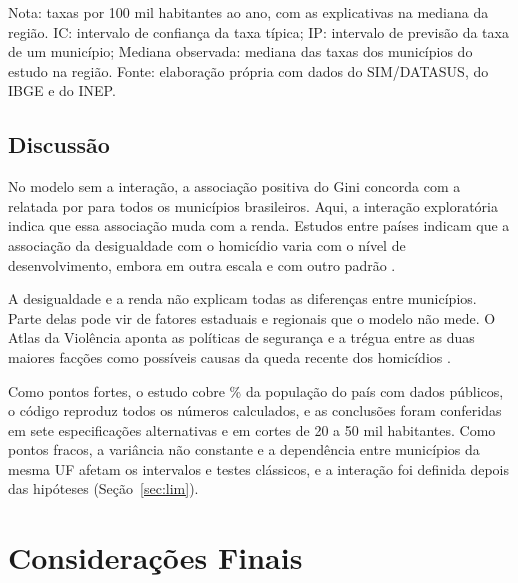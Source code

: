 \documentclass[a4paper,11pt]{article}
\newcommand{\fonte}{Fonte: elaboração própria com dados do SIM/DATASUS, do IBGE e do INEP.}
\newcommand{\nota}[2][\fonte]{\par\vspace{2pt}\begin{minipage}{\linewidth}\footnotesize Nota: #2 #1\end{minipage}}
\begin{document}
\begin{table}[!htb]
\centering
\caption{Taxa típica estimada para os municípios de referência}
\label{tab:prev}
\small
%
\nota{taxas por 100 mil habitantes ao ano, com as explicativas na mediana da região. IC: intervalo de confiança da taxa típica; IP: intervalo de previsão da taxa de um município; Mediana observada: mediana das taxas dos municípios do estudo na região.}
\end{table}

\subsection{Discussão}

No modelo sem a interação, a associação positiva do Gini concorda com a relatada por \citet{wanzinack2022} para todos os municípios brasileiros. Aqui, a interação exploratória indica que essa associação muda com a renda. Estudos entre países indicam que a associação da desigualdade com o homicídio varia com o nível de desenvolvimento, embora em outra escala e com outro padrão \citep{ouimet2012, aransiola2024}.

A desigualdade e a renda não explicam todas as diferenças entre municípios. Parte delas pode vir de fatores estaduais e regionais que o modelo não mede. O Atlas da Violência aponta as políticas de segurança e a trégua entre as duas maiores facções como possíveis causas da queda recente dos homicídios \citep{cerqueira2025}.


Como pontos fortes, o estudo cobre \nPctPopEsc\% da população do país com dados públicos, o código reproduz todos os números calculados, e as conclusões foram conferidas em sete especificações alternativas e em cortes de 20 a 50 mil habitantes. Como pontos fracos, a variância não constante e a dependência entre municípios da mesma UF afetam os intervalos e testes clássicos, e a interação foi definida depois das hipóteses (Seção~\ref{sec:lim}).


\section{Considerações Finais}
\end{document}
